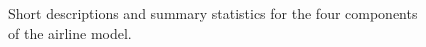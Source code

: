 \documentclass[letterpaper]{article}
\begin{document}
\begin{figure}[h]
\centering
{}
\caption{
Short descriptions and summary statistics for the four components of the airline model.}
\label{fig:exec-airline}
\end{figure}

\end{document}
